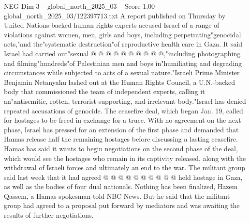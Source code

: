 \begin{textsample}{NEG Dim 3 – global\_north\_2025\_03 – Score 1.00 – global\_north\_2025\_03/122397713.txt}
A report published on Thursday by United Nations-backed human rights experts accused Israel of a range of violations against women, men, girls and boys, including perpetrating"genocidal acts,"and the"systematic destruction"of reproductive health care in Gaza.
It said Israel had carried out"sexual @ @ @ @ @ @ @ @ @ @,"including photographing and filming"hundreds"of Palestinian men and boys in"humiliating and degrading circumstances while subjected to acts of a sexual nature."Israeli Prime Minister Benjamin Netanyahu lashed out at the Human Rights Council, a U.N.-backed body that commissioned the team of independent experts, calling it an"antisemitic, rotten, terrorist-supporting, and irrelevant body."Israel has denied repeated accusations of genocide.
The ceasefire deal, which began Jan. 19, called for hostages to be freed in exchange for a truce.
With no agreement on the next phase, Israel has pressed for an extension of the first phase and demanded that Hamas release half the remaining hostages before discussing a lasting ceasefire.
Hamas has said it wants to begin negotiations on the second phase of the deal, which would see the hostages who remain in its captivity released, along with the withdrawal of Israeli forces and ultimately an end to the war.
The militant group said last week that it had agreed @ @ @ @ @ @ @ @ @ @ held hostage in Gaza, as well as the bodies of four dual nationals.
Nothing has been finalized, Hazem Qassem, a Hamas spokesman told NBC News.
But he said that the militant group had agreed to a proposal put forward by mediators and was awaiting the results of further negotiations.

\end{textsample}
